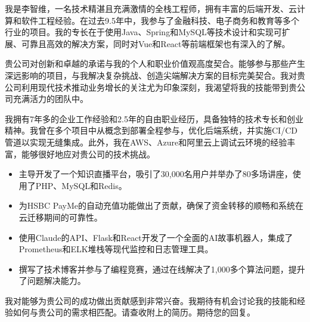 \documentclass[11pt, a4paper]{./latex/awesome-cv}
\begin{document}
\makecvheader[C]


\makelettertitle

\begin{cvletter}

我是李智维，一名技术精湛且充满激情的全栈工程师，拥有丰富的后端开发、云计算和软件工程经验。在过去9.5年中，我参与了金融科技、电子商务和教育等多个行业的项目。我的专长在于使用Java、Spring和MySQL等技术设计和实现可扩展、可靠且高效的解决方案，同时对Vue和React等前端框架也有深入的了解。

贵公司对创新和卓越的承诺与我的个人和职业价值观高度契合。能够参与那些产生深远影响的项目，与我解决复杂挑战、创造尖端解决方案的目标完美契合。我对贵公司利用现代技术推动业务增长的关注尤为印象深刻，我渴望将我的技能带到贵公司充满活力的团队中。

我拥有7年多的企业工作经验和2.5年的自由职业经历，具备独特的技术专长和创业精神。我曾在多个项目中从概念到部署全程参与，优化后端系统，并实施CI/CD管道以实现无缝集成。此外，我在AWS、Azure和阿里云上调试云环境的经验丰富，能够很好地应对贵公司的技术挑战。

\begin{itemize}
  \item 主导开发了一个知识直播平台，吸引了30,000名用户并举办了80多场讲座，使用了PHP、MySQL和Redis。
  \item 为HSBC PayMe的自动充值功能做出了贡献，确保了资金转移的顺畅和系统在云迁移期间的可靠性。
  \item 使用Claude的API、Flask和React开发了一个全面的AI故事机器人，集成了Prometheus和ELK堆栈等现代监控和日志管理工具。
  \item 撰写了技术博客并参与了编程竞赛，通过在线解决了1,000多个算法问题，提升了问题解决能力。
\end{itemize}

我对能够为贵公司的成功做出贡献感到非常兴奋。我期待有机会讨论我的技能和经验如何与贵公司的需求相匹配。请查收附上的简历。期待您的回复。

\end{cvletter}

\makeletterclosing
\end{document}

